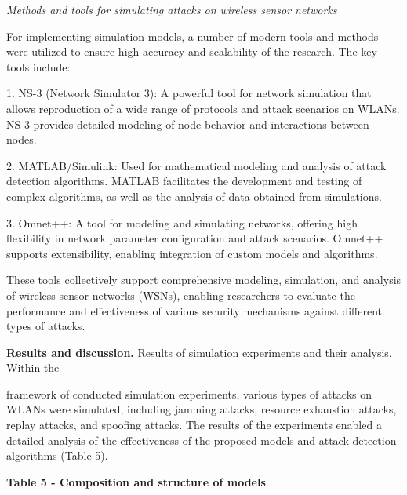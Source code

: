 \emph{Methods and tools for simulating attacks on wireless sensor
networks}

For implementing simulation models, a number of modern tools and methods
were utilized to ensure high accuracy and scalability of the research.
The key tools include:

1. NS-3 (Network Simulator 3): A powerful tool for network simulation
that allows reproduction of a wide range of protocols and attack
scenarios on WLANs. NS-3 provides detailed modeling of node behavior and
interactions between nodes.

2. MATLAB/Simulink: Used for mathematical modeling and analysis of
attack detection algorithms. MATLAB facilitates the development and
testing of complex algorithms, as well as the analysis of data obtained
from simulations.

3. Omnet++: A tool for modeling and simulating networks, offering high
flexibility in network parameter configuration and attack scenarios.
Omnet++ supports extensibility, enabling integration of custom models
and algorithms.

These tools collectively support comprehensive modeling, simulation, and
analysis of wireless sensor networks (WSNs), enabling researchers to
evaluate the performance and effectiveness of various security
mechanisms against different types of attacks.

{\bfseries Results and discussion.} Results of simulation experiments and
their analysis. Within the

framework of conducted simulation experiments, various types of attacks
on WLANs were simulated, including jamming attacks, resource exhaustion
attacks, replay attacks, and spoofing attacks. The results of the
experiments enabled a detailed analysis of the effectiveness of the
proposed models and attack detection algorithms (Table 5).

{\bfseries Table 5 - Composition and structure of models}

